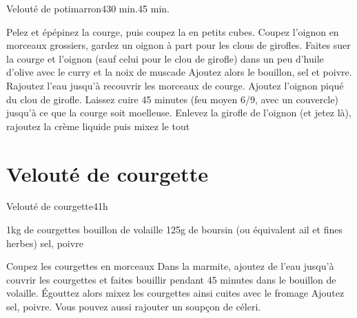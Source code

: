 {\begin{recette}{Velouté de potimarron}{4}{30 min.}{45 min.}
\begin{preparation}
\etape Pelez et épépinez la courge, puis coupez la en petits cubes. Coupez l'oignon en morceaux grossiers, gardez un oignon à part pour les clous de girofles.
\etape Faites suer la courge et l'oignon (sauf celui pour le clou de girofle) dans un peu d'huile d'olive avec le curry et la noix de muscade
\etape Ajoutez alors le bouillon, sel et poivre. Rajoutez l'eau jusqu'à recouvrir les morceaux de courge. Ajoutez l'oignon piqué du clou de girofle.
\etape Laissez cuire 45 minutes (feu moyen 6/9, avec un couvercle) jusqu'à ce que la courge soit moelleuse.
\etape Enlevez la girofle de l'oignon (et jetez là), rajoutez la crème liquide puis mixez le tout
\end{preparation}
\end{recette}

\section{Velouté de courgette}
\begin{recette}{Velouté de courgette}{4}{1h}{}
\begin{ingredients}
\ingredient 1kg de courgettes
\ingredient bouillon de volaille
\ingredient 125g de boursin (ou équivalent ail et fines herbes)
\ingredient sel, poivre
\end{ingredients}

\begin{preparation}
\etape Coupez les courgettes en morceaux 
\etape Dans la marmite, ajoutez de l'eau jusqu'à couvrir les courgettes et faites bouillir pendant 45 minutes dans le bouillon
de volaille. 
\etape Égouttez alors mixez les courgettes ainsi cuites avec le fromage
\etape Ajoutez sel, poivre. Vous pouvez aussi rajouter un soupçon de céleri.
\end{preparation}
\end{recette}

}%
